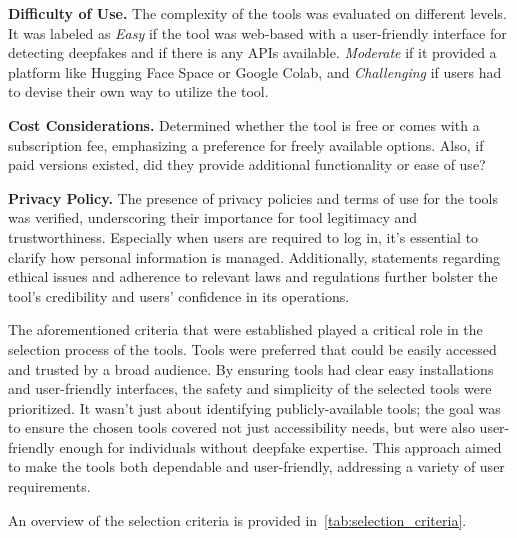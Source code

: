 \textbf{Difficulty of Use.} The complexity of the tools was evaluated on different levels.
It was labeled as \textit{Easy} if the tool was web-based with a user-friendly
interface for detecting deepfakes and if there is any \ac{API}s available. \textit{Moderate} 
if it provided a platform like Hugging Face Space or Google Colab, and \textit{Challenging} 
if users had to devise their own way to utilize the tool.

\textbf{Cost Considerations.} Determined whether the tool is free or comes with a
subscription fee, emphasizing a preference for freely available options. Also, if
paid versions existed, did they provide additional functionality or ease of use?

\textbf{Privacy Policy.} The presence of privacy policies and terms of use for the
tools was verified, underscoring their importance for tool legitimacy and
trustworthiness. Especially when users are required to log in, it's essential
to clarify how personal information is managed. Additionally, statements regarding
ethical issues and adherence to relevant laws and regulations further bolster the
tool's credibility and users' confidence in its operations.

The aforementioned criteria that were established played a critical role in the
selection process of the tools. Tools were preferred that could be easily
accessed and trusted by a broad audience. By ensuring tools had clear easy
installations and user-friendly interfaces, the safety and simplicity of the
selected tools were prioritized. It wasn't just about identifying 
publicly-available tools; the goal was to ensure the chosen tools covered not just
accessibility needs, but were also user-friendly enough for individuals without
deepfake expertise. This approach aimed to make the tools both dependable and
user-friendly, addressing a variety of user requirements.

An overview of the selection criteria is provided in~\autoref{tab:selection_criteria}.

